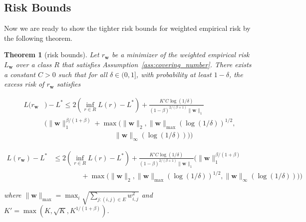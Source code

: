 \documentclass[letterpaper]{article} %
\def\DoubleColumn{}
\def\DoubleColumnEnd{}
\def\SingleColumn{}
\def\SingleColumnEnd{}
\newtheorem{theorem}{Theorem}
\newcommand{\weight}{\mathbf{w}}
\newcommand{\bayeserror}{L^*}
\newcommand{\empiricalrisk}[1]{L_{#1}}
\newcommand{\risk}{L}
\newcommand{\pair}[1]{(#1)}
\newcommand{\normo}[1]{\|#1\|_1}
\newcommand{\complexbound}{\beta}
\begin{document}
\subsection{Risk Bounds} %
\label{sub:risk_bounds}
Now we are ready to show the tighter risk bounds for weighted empirical risk by the following theorem.
\begin{theorem}[risk bounds]
    \label{th:main_theorem}
    Let $r_\weight{}$ be a minimizer of the weighted empirical risk $\empiricalrisk{\weight{}}$ over a class $R$ that satisfies Assumption~\ref{ass:covering_number}. There exists a constant $C>0$ such that for all $\delta\in(0,1]$, with probability at least $1-\delta$, the excess risk of $r_\weight{}$ satisfies
    \DoubleColumn
    \begin{equation}
        \begin{aligned}
            \label{eq:main_result}
            \risk(r_\weight{}&)-\bayeserror \le 2(\inf_{r\in R}\risk(r)-\bayeserror) + \frac{K'C\log(1/\delta)}{(1-\complexbound)^{2/(\complexbound+1)}\normo{\weight{}}}\\
            &\bigg(\normo{\weight{}}^{\complexbound/(1+\complexbound)}+\max\Big(\|\weight{}\|_2,\|\weight{}\|_{\max}(\log(1/\delta))^{1/2},\\
            &\qquad\qquad\qquad\qquad\qquad\|\weight{}\|_\infty(\log(1/\delta))\Big)\bigg)
        \end{aligned}
    \end{equation}
    \DoubleColumnEnd
    \SingleColumn
    \begin{equation}
        \begin{aligned}
            \label{eq:main_result}
            \risk(r_\weight{})-\bayeserror &\le 2(\inf_{r\in R}\risk(r)-\bayeserror) + \frac{K'C\log(1/\delta)}{(1-\complexbound)^{2/(\complexbound+1)}\normo{\weight{}}}\bigg(\normo{\weight{}}^{\complexbound/(1+\complexbound)}\\
            &\qquad\qquad+\max\Big(\|\weight{}\|_2,\|\weight{}\|_{\max}(\log(1/\delta))^{1/2},\|\weight{}\|_\infty(\log(1/\delta))\Big)\bigg)
        \end{aligned}
    \end{equation}
    \SingleColumnEnd
    where $\|\weight{}\|_{\max}=\max_i \sqrt{\sum_{j:\pair{i,j}\in E} w_{i,j}^2}$ and $K'=\max(K,\sqrt{K},K^{1/(1+\complexbound{})})$.
\end{theorem}
\end{document}
